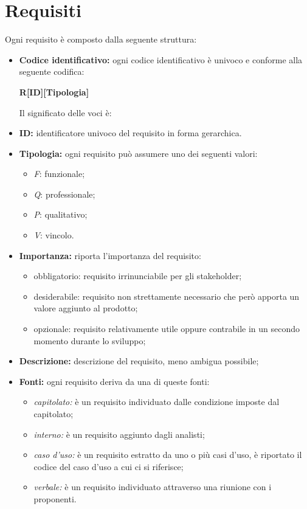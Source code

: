 \section{Requisiti}
Ogni requisito è composto dalla seguente struttura:
\begin{itemize}
    \item \textbf{Codice identificativo:} ogni codice identificativo è univoco e conforme alla seguente codifica:
    \begin{center}
        \textbf{R[ID][Tipologia]}
    \end{center}
    Il significato delle voci è:
    \item \textbf{ID:} identificatore univoco del requisito in forma gerarchica.
    \item \textbf{Tipologia:} ogni requisito può assumere uno dei seguenti valori:
    \begin{itemize}
        \item \textit{F}: funzionale;
        \item \textit{Q}: professionale;
        \item \textit{P}: qualitativo;
        \item \textit{V}: vincolo.
    \end{itemize}
    \item \textbf{Importanza:} riporta l'importanza del requisito:
    \begin{itemize}
        \item obbligatorio: requisito irrinunciabile per gli stakeholder;
        \item desiderabile: requisito non strettamente necessario che però apporta un valore aggiunto al prodotto;
        \item opzionale: requisito relativamente utile oppure contrabile in un secondo momento durante lo sviluppo;
    \end{itemize}
    \item \textbf{Descrizione:} descrizione del requisito, meno ambigua possibile;
    \item \textbf{Fonti:} ogni requisito deriva da una di queste fonti:
    \begin{itemize}
        \item \textit{capitolato:} è un requisito individuato dalle condizione imposte dal capitolato;
        \item \textit{interno:} è un requisito aggiunto dagli analisti;
        \item \textit{caso d'uso:} è un requisito estratto da uno o più casi d'uso, è riportato il codice del caso d'uso a cui ci si riferisce;
        \item \textit{verbale:} è un requisito individuato attraverso una riunione con i proponenti.
    \end{itemize}
\end{itemize}


